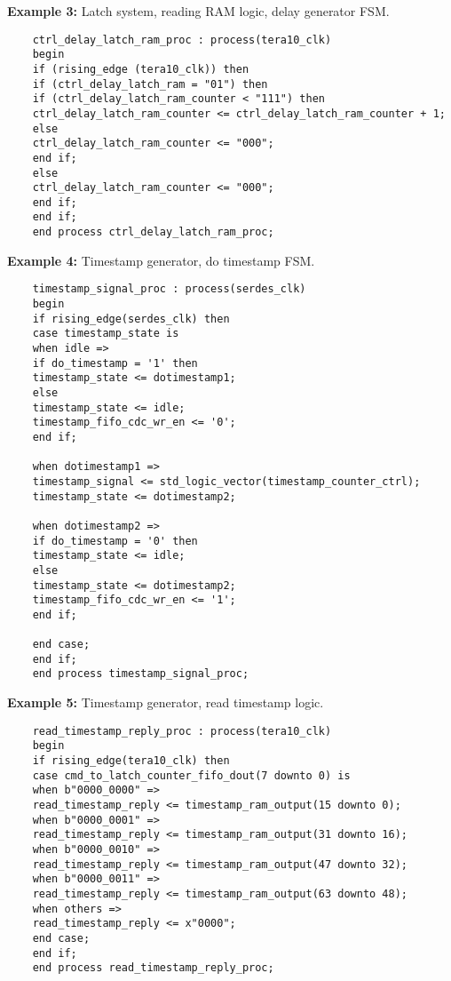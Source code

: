\noindent \textbf{Example 3:} Latch system, reading RAM logic, delay generator FSM.
\begin{verbatim}
	ctrl_delay_latch_ram_proc : process(tera10_clk)
	begin
	if (rising_edge (tera10_clk)) then
	if (ctrl_delay_latch_ram = "01") then
	if (ctrl_delay_latch_ram_counter < "111") then
	ctrl_delay_latch_ram_counter <= ctrl_delay_latch_ram_counter + 1;
	else 
	ctrl_delay_latch_ram_counter <= "000";
	end if;
	else 
	ctrl_delay_latch_ram_counter <= "000";
	end if;
	end if;
	end process ctrl_delay_latch_ram_proc;
\end{verbatim}
\noindent \textbf{Example 4:} Timestamp generator, do timestamp FSM.
\begin{verbatim}
	timestamp_signal_proc : process(serdes_clk)
	begin
	if rising_edge(serdes_clk) then
	case timestamp_state is
	when idle =>
	if do_timestamp = '1' then
	timestamp_state <= dotimestamp1;
	else
	timestamp_state <= idle;
	timestamp_fifo_cdc_wr_en <= '0';
	end if;
	
	when dotimestamp1 =>
	timestamp_signal <= std_logic_vector(timestamp_counter_ctrl);
	timestamp_state <= dotimestamp2;
	
	when dotimestamp2 =>
	if do_timestamp = '0' then
	timestamp_state <= idle;
	else
	timestamp_state <= dotimestamp2;
	timestamp_fifo_cdc_wr_en <= '1';
	end if;
	
	end case;
	end if;
	end process timestamp_signal_proc;
\end{verbatim}
\noindent \textbf{Example 5:} Timestamp generator, read timestamp logic.
\begin{verbatim}
	read_timestamp_reply_proc : process(tera10_clk)
	begin
	if rising_edge(tera10_clk) then
	case cmd_to_latch_counter_fifo_dout(7 downto 0) is
	when b"0000_0000" =>
	read_timestamp_reply <= timestamp_ram_output(15 downto 0);
	when b"0000_0001" =>
	read_timestamp_reply <= timestamp_ram_output(31 downto 16);
	when b"0000_0010" =>
	read_timestamp_reply <= timestamp_ram_output(47 downto 32);
	when b"0000_0011" =>
	read_timestamp_reply <= timestamp_ram_output(63 downto 48);
	when others =>
	read_timestamp_reply <= x"0000";
	end case;
	end if;
	end process read_timestamp_reply_proc;
\end{verbatim}